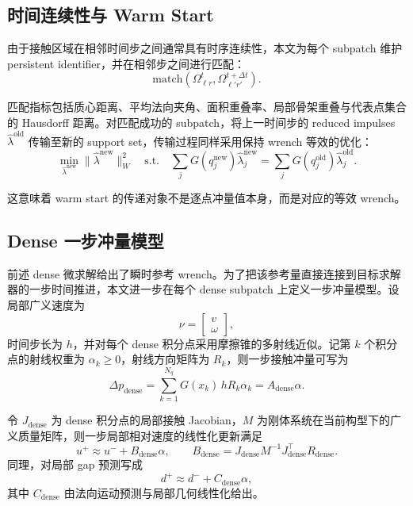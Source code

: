 \subsection{时间连续性与 Warm Start}

由于接触区域在相邻时间步之间通常具有时序连续性，本文为每个 subpatch 维护 persistent identifier，并在相邻步之间进行匹配：
\begin{equation}
\mathrm{match}(\Omega_{\ell r}^{t}, \Omega_{\ell' r'}^{t+\Delta t}).
\end{equation}

匹配指标包括质心距离、平均法向夹角、面积重叠率、局部骨架重叠与代表点集合的 Hausdorff 距离。对匹配成功的 subpatch，将上一时间步的 reduced impulses $\hat{\lambda}^{\mathrm{old}}$ 传输至新的 support set，传输过程同样采用保持 wrench 等效的优化：
\begin{equation}
\min_{\hat{\lambda}^{\mathrm{new}}}
\|\hat{\lambda}^{\mathrm{new}}\|_W^2
\quad
\text{s.t.}\quad
\sum_j G(q_j^{\mathrm{new}})\hat{\lambda}_j^{\mathrm{new}}
=
\sum_j G(q_j^{\mathrm{old}})\hat{\lambda}_j^{\mathrm{old}}.
\end{equation}

这意味着 warm start 的传递对象不是逐点冲量值本身，而是对应的等效 wrench。

\subsection{Dense 一步冲量模型}

前述 dense 微求解给出了瞬时参考 wrench。为了把该参考量直接连接到目标求解器的一步时间推进，本文进一步在每个 dense subpatch 上定义一步冲量模型。设局部广义速度为
\begin{equation}
\nu =
\begin{bmatrix}
v \\
\omega
\end{bmatrix},
\end{equation}
时间步长为 $h$，并对每个 dense 积分点采用摩擦锥的多射线近似。记第 $k$ 个积分点的射线权重为 $\alpha_k \ge 0$，射线方向矩阵为 $R_k$，则一步接触冲量可写为
\begin{equation}
\Delta p_{\mathrm{dense}}
=
\sum_{k=1}^{N_q} G(x_k) \, h R_k \alpha_k
=
A_{\mathrm{dense}}\alpha.
\end{equation}

令 $J_{\mathrm{dense}}$ 为 dense 积分点的局部接触 Jacobian，$M$ 为刚体系统在当前构型下的广义质量矩阵，则一步局部相对速度的线性化更新满足
\begin{equation}
u^{+}
\approx
u^{-} + B_{\mathrm{dense}}\alpha,
\qquad
B_{\mathrm{dense}} = J_{\mathrm{dense}} M^{-1} J_{\mathrm{dense}}^{\top} R_{\mathrm{dense}}.
\end{equation}
同理，对局部 gap 预测写成
\begin{equation}
d^{+}
\approx
d^{-} + C_{\mathrm{dense}}\alpha,
\end{equation}
其中 $C_{\mathrm{dense}}$ 由法向运动预测与局部几何线性化给出。

